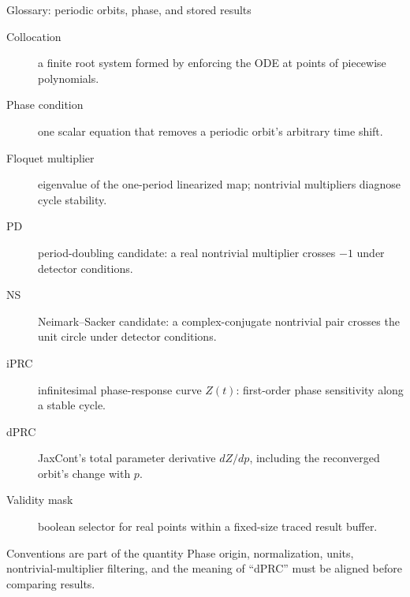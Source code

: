 \begin{frame}{Glossary: periodic orbits, phase, and stored results}
\scriptsize
\begin{description}
  \item[Collocation] a finite root system formed by enforcing the ODE at points of piecewise polynomials.
  \item[Phase condition] one scalar equation that removes a periodic orbit's arbitrary time shift.
  \item[Floquet multiplier] eigenvalue of the one-period linearized map; nontrivial multipliers diagnose cycle stability.
  \item[PD] period-doubling candidate: a real nontrivial multiplier crosses $-1$ under detector conditions.
  \item[NS] Neimark--Sacker candidate: a complex-conjugate nontrivial pair crosses the unit circle under detector conditions.
  \item[iPRC] infinitesimal phase-response curve $Z(t)$: first-order phase sensitivity along a stable cycle.
  \item[dPRC] JaxCont's total parameter derivative $dZ/dp$, including the reconverged orbit's change with $p$.
  \item[Validity mask] boolean selector for real points within a fixed-size traced result buffer.
\end{description}

\begin{alertblock}{Conventions are part of the quantity}
Phase origin, normalization, units, nontrivial-multiplier filtering, and the
meaning of ``dPRC'' must be aligned before comparing results.
\end{alertblock}
\end{frame}

